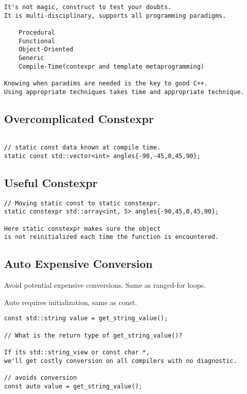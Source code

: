 \documentclass[openany]{report}
\begin{document}
\begin{verbatim}
It's not magic, construct to test your doubts.
It is multi-disciplinary, supports all programming paradigms.

    Procedural
    Functional
    Object-Oriented
    Generic
    Compile-Time(contexpr and template metaprogramming)

Knowing when paradims are needed is the key to good C++.
Using appropriate techniques takes time and appropriate technique. 
\end{verbatim}

\subsection{Overcomplicated Constexpr}

\begin{verbatim}

// static const data known at compile time. 
static const std::vector<int> angles{-90,-45,0,45,90};
\end{verbatim}

\subsection{Useful Constexpr}

\begin{verbatim}
// Moving static const to static constexpr.
static constexpr std::array<int, 5> angles{-90,45,0,45,90};

Here static constexpr makes sure the object
is not reinitialized each time the function is encountered.

\end{verbatim}

\subsection{Auto Expensive Conversion}

Avoid potential expensive conversions. Same as ranged-for loops. 

Auto requires initialization, same as const. 

\begin{verbatim}
const std::string value = get_string_value();

// What is the return type of get_string_value()? 

If its std::string_view or const char *,
we'll get costly conversion on all compilers with no diagnostic. 

// avoids conversion
const auto value = get_string_value();
\end{verbatim}
\end{document}
